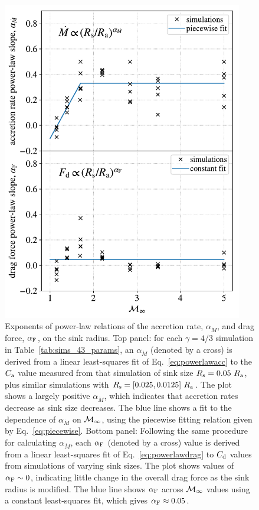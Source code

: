 \begin{figure}[tbp]
\centering
 \includegraphics[width=10.5cm]{figures/common_envelope/Sink_Scaling.pdf}
 \caption{Exponents of power-law relations of the accretion rate, $\alpha_{\dot M}$, and drag force, $\alpha_{\rm F}$, on the sink radius. Top panel: for each $\gamma = 4/3$ simulation in Table~\ref{tab:sims_43_params}, an $\alpha_{\dot M}$ (denoted by a cross) is derived from a linear least-squares fit of Eq.~\eqref{eq:powerlawacc} to the $C_{\rm a}$ value measured from that simulation of sink size $R_{\rm s} = 0.05~R_{\rm a}$, plus similar simulations with $R_{\rm s} = [0.025, 0.0125]~R_{\rm a}$. The plot shows a largely positive $\alpha_{\dot M}$, which indicates that accretion rates decrease as sink size decreases. The blue line shows a fit to the dependence of $\alpha_{\dot M}$ on $\cal {M}_\infty$, using the piecewise fitting relation given by Eq.~\eqref{eq:piecewise}.
 Bottom panel: Following the same procedure for calculating $\alpha_{\dot M}$, each $\alpha_{\rm F}$ (denoted by a cross) value is derived from a linear least-squares fit of Eq.~\eqref{eq:powerlawdrag} to $C_{\rm d}$ values from simulations of varying sink sizes. The plot shows values of $\alpha_{\rm F} \sim 0$, indicating little change in the overall drag force as the sink radius is modified. The blue line shows $\alpha_{\rm F}$ across $\cal {M}_\infty$ values using a constant least-squares fit, which gives $\alpha_{\rm F} \approx 0.05$.
 \label{fig:sink} }
\vspace{5mm}
\end{figure}



